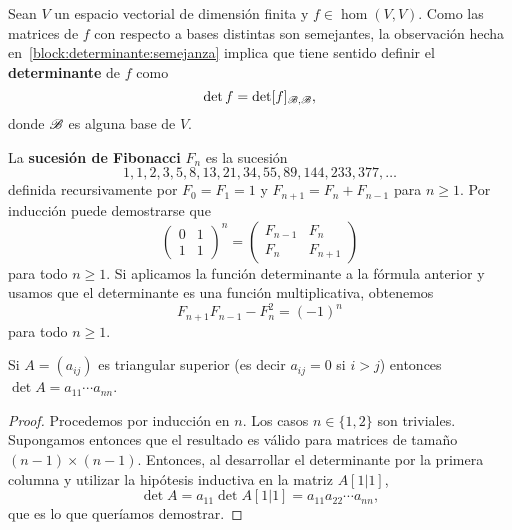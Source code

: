 \begin{block}
	Sean $V$ un espacio vectorial de dimensión finita y $f\in\hom(V,V)$. Como
	las matrices de $f$ con respecto a bases distintas son semejantes, la
	observación hecha en~\ref{block:determinante:semejanza} implica que tiene
	sentido definir el \textbf{determinante} de $f$ como
	\[
		\det f=\det [f]_{\mathscr{B},\mathscr{B}},
	\]
	donde $\mathscr{B}$ es alguna base de $V$. 
\end{block}

\begin{example}
    \label{exa:det:fibonacci}
	La \textbf{sucesión de Fibonacci} $F_n$
    es la sucesión 
	\[
        1,1,2,3,5,8,13,21,34,55,89,144,233,377,\dots
    \]
	definida recursivamente por $F_0=F_1=1$ y
    $F_{n+1}=F_n+F_{n-1}$ para $n\geq1$. Por inducción puede demostrarse que 
    \[
        \begin{pmatrix}
            0 & 1\\
            1 & 1
        \end{pmatrix}^n
        =
        \begin{pmatrix}
            F_{n-1} & F_n\\
            F_n & F_{n+1}
        \end{pmatrix}
    \]
	para todo $n\geq1$. Si aplicamos la función determinante a la fórmula
	anterior y usamos que el determinante es una función multiplicativa,
	obtenemos
    \[
        F_{n+1}F_{n-1}-F_n^2=(-1)^n
    \]
    para todo $n\geq1$.
\end{example}

\begin{prop}
	Si $A=(a_{ij})$ es triangular superior (es decir $a_{ij}=0$ si $i>j$)
	entonces $\det A=a_{11}\cdots a_{nn}$. 	

	\begin{proof}
		Procedemos por inducción en $n$. Los casos $n\in\{1,2\}$ son triviales.
		Supongamos entonces que el resultado es válido para matrices de tamaño
		$(n-1)\times(n-1)$. Entonces, al desarrollar el determinante por la
		primera columna y utilizar la hipótesis inductiva en la matriz $A[1|1]$, 
		\[
		\det A=a_{11}\det A[1|1]=a_{11}a_{22}\cdots a_{nn},
		\]
		que es lo que queríamos demostrar.
	\end{proof}
\end{prop}

